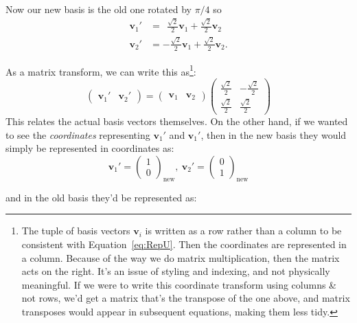 	Now our new basis is the old one rotated by $\pi/4$ so 
	\begin{align*}
		\mathbf v_1' &= ~~ \frac{\sqrt 2}{2} \mathbf v_1 + \frac{\sqrt 2}{2} \mathbf v_2\\
		\mathbf v_2' &= - \frac{\sqrt 2}{2}\mathbf v_1 + \frac{\sqrt 2}{2}\mathbf v_2.
	\end{align*}
	
	
	As a matrix transform, we can write this as\footnote{The tuple of basis vectors $\mathbf v_i$ is written as a row rather than a column to be consistent with Equation~\eqref{eq:RepU}. Then the coordinates are represented in a column. Because of the way we do matrix multiplication, then the matrix acts on the right. It's an issue of styling and indexing, and not physically meaningful. If we were to write this coordinate transform using columns \& not rows, we'd get a matrix that's the transpose of the one above, and matrix transposes would appear in subsequent equations, making them less tidy.}:
	\begin{equation*}
		\begin{pmatrix}
			\mathbf v_1' & \mathbf v_2'
		\end{pmatrix}
		= 
		\begin{pmatrix}
			\mathbf v_1 & \mathbf v_2
		\end{pmatrix}
		\begin{pmatrix}
					 \frac{\sqrt 2}{2} &  -\frac{\sqrt 2}{2} \\
					 \frac{\sqrt 2}{2} &  \frac{\sqrt 2}{2}
		\end{pmatrix}
	\end{equation*}
	This relates the actual basis vectors themselves. On the other hand, if we wanted to see the \emph{coordinates} representing $\mathbf v_1'$ and $\mathbf v_1'$, then in the new basis they would simply be represented in coordinates as: 
	\begin{equation*}
		\mathbf v_1' = \begin{pmatrix}
			1 \\ 0
		\end{pmatrix}_{\mathrm{new}}, ~
		\mathbf v_2' = \begin{pmatrix}
			0 \\ 1
		\end{pmatrix}_{\mathrm{new}}
	\end{equation*}
	
	and in the old basis they'd be represented as:
	

